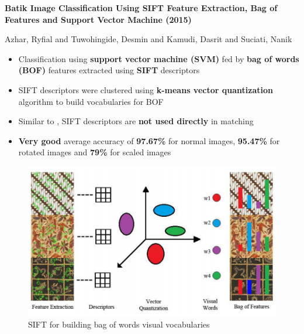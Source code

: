 \documentclass[10pt]{beamer}
\begin{document}
\begin{frame}{\cite{azhar2015batik}}

	\textbf{Batik Image Classification Using SIFT Feature Extraction, Bag of Features and Support Vector Machine (2015)}
	
	{\small Azhar, Ryfial and Tuwohingide, Desmin and Kamudi, Dasrit and Suciati, Nanik}
	
	\begin{itemize}[<+->]
		
		\item Classification using \textbf{support vector machine (SVM)} fed by \textbf{bag of words (BOF)} features extracted using \textbf{SIFT} descriptors
		
		\item SIFT descriptors were clustered using \textbf{k-means vector quantization} algorithm to build vocabularies for BOF
		
		\item Similar to \citep{nurhaida2015automatic}, SIFT descriptors are \textbf{not used directly} in matching
		
		\item \textbf{Very good} average accuracy of \textbf{97.67\%} for normal images, \textbf{95.47\%} for rotated images and \textbf{79\%} for scaled images
		
	\end{itemize}
	
\end{frame}

\begin{frame}{\cite{azhar2015batik}}
	\begin{figure}
		\centering
		\includegraphics[width=1.0\linewidth]{sift-bag-of-words}
		\caption{SIFT for building bag of words visual vocabularies}
		\label{fig_sift_bag_of_words}
    \end{figure}
\end{frame}
\end{document}
